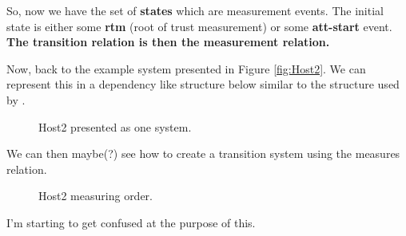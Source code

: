 \documentclass[12pt, letterpaper]{article}
\begin{document}
So, now we have the set of \textbf{states} which are measurement events. The initial state is either some \textbf{rtm} (root of trust measurement) or some \textbf{att-start} event. \textbf{The transition relation is then the measurement relation.} 

Now, back to the example system presented in Figure \ref{fig:Host2}. We can represent this in a dependency like structure below similar to the structure used by \cite{Rowe::Bundling}. 

\begin{figure}[hbtp]
  \centering
  
  \caption{Host2 presented as one system.}
  \label{host2-block}
\end{figure}

We can then maybe(?) see how to create a transition system using the measures relation. 

\begin{figure}[hbtp]
  \centering
  
  \caption{Host2 measuring order.}
  \label{host2-measord}
\end{figure}

I'm starting to get confused at the purpose of this. 

\pagebreak



\end{document}
